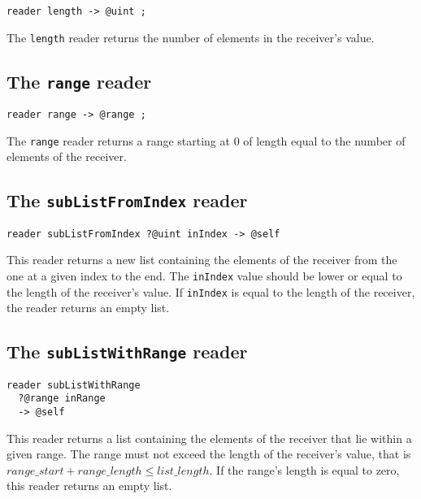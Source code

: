 \begin{lstlisting}[language=galgas]
reader length -> @uint ;
\end{lstlisting}

The \lstinline[language=galgas]!length! reader returns the number of elements in the receiver's value.


\subsection{The \lstinline[language=galgas]!range! reader}

\begin{lstlisting}[language=galgas]
reader range -> @range ;
\end{lstlisting}

The \lstinline[language=galgas]!range! reader returns a range starting at $0$ of length equal to the number of elements of the receiver.




\subsection{The \lstinline[language=galgas]!subListFromIndex! reader}

\begin{lstlisting}[language=galgas]
reader subListFromIndex ?@uint inIndex -> @self
\end{lstlisting}

This reader returns a new list containing the elements of the receiver from the one at a given index to the end. The  \lstinline[language=galgas]!inIndex! value should be lower or equal to the length of the receiver's value. If \lstinline[language=galgas]!inIndex! is equal to the length of the receiver, the reader returns an empty list.


\subsection{The \lstinline[language=galgas]!subListWithRange! reader}

\begin{lstlisting}[language=galgas]
reader subListWithRange
  ?@range inRange
  -> @self
\end{lstlisting}

This reader returns a list containing the elements of the receiver that lie within a given range. The range must not exceed the length of the receiver's value, that is $range\_start + range\_length \leqslant list\_length$. If the range's length is equal to zero, this reader returns an empty list.





